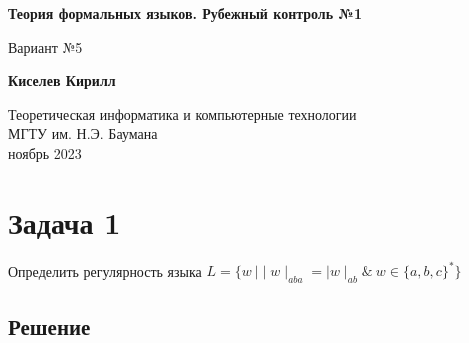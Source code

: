 \documentclass[a4paper, 14pt]{article}
\begin{document}
\begin{titlepage}
    \begin{center}
        \vspace*{1cm}
            
        \Huge
        \textbf{Теория формальных языков. Рубежный контроль №1}
		
        \vspace{0.5cm}
        \LARGE
        Вариант №5
            
        \vspace{1.5cm}
            
        \textbf{Киселев Кирилл}
            
        \vfill
            
        \vspace{0.8cm}
		
        \Large
        Теоретическая информатика и компьютерные технологии\\
        МГТУ им. Н.Э. Баумана\\
        ноябрь 2023
            
    \end{center}
\end{titlepage}

\newpage

\tableofcontents 

\newpage

\section{Задача 1}

Определить регулярность языка $L = \{w \ \Big\vert \mid w \mid_{aba} = \mid w \mid_{ab}  \& \ w \in \{a, b, c\}^{*} \}$

\subsection{Решение}
\end{document}
